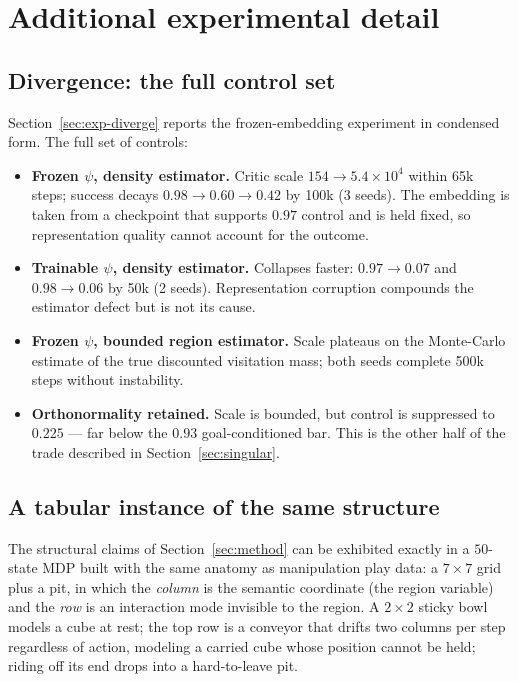 \appendix
\section{Additional experimental detail}
\label{app:detail}

\subsection{Divergence: the full control set}
\label{app:diverge}

Section~\ref{sec:exp-diverge} reports the frozen-embedding experiment in
condensed form. The full set of controls:

\begin{itemize}
\item \textbf{Frozen $\psi$, density estimator.} Critic scale
$154 \to 5.4\times10^{4}$ within 65k steps; success decays
$0.98\to0.60\to0.42$ by 100k (3 seeds). The embedding is taken from a checkpoint
that supports $0.97$ control and is held fixed, so representation quality cannot
account for the outcome.
\item \textbf{Trainable $\psi$, density estimator.} Collapses faster:
$0.97\to0.07$ and $0.98\to0.06$ by 50k (2 seeds). Representation corruption
compounds the estimator defect but is not its cause.
\item \textbf{Frozen $\psi$, bounded region estimator.} Scale plateaus on the
Monte-Carlo estimate of the true discounted visitation mass; both seeds complete
500k steps without instability.
\item \textbf{Orthonormality retained.} Scale is bounded, but control is
suppressed to $0.225$ --- far below the $0.93$ goal-conditioned bar. This is the
other half of the trade described in Section~\ref{sec:singular}.
\end{itemize}

\subsection{A tabular instance of the same structure}
\label{app:playpen}

The structural claims of Section~\ref{sec:method} can be exhibited exactly in a
$50$-state MDP built with the same anatomy as manipulation play data: a $7\times7$
grid plus a pit, in which the \emph{column} is the semantic coordinate (the
region variable) and the \emph{row} is an interaction mode invisible to the
region. A $2\times2$ sticky bowl models a cube at rest; the top row is a conveyor
that drifts two columns per step regardless of action, modeling a carried cube
whose position cannot be held; riding off its end drops into a hard-to-leave pit.

